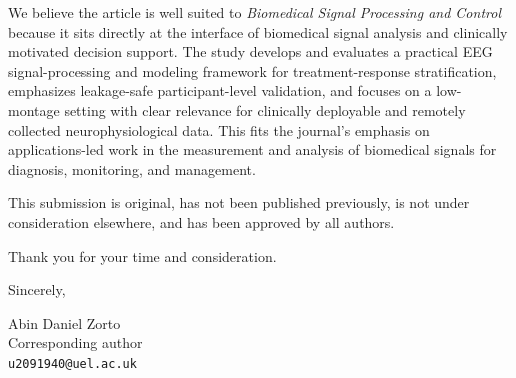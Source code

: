 \documentclass[11pt]{article}
\begin{document}
We believe the article is well suited to \emph{Biomedical Signal Processing and Control} because it sits directly at the interface of biomedical signal analysis and clinically motivated decision support. The study develops and evaluates a practical EEG signal-processing and modeling framework for treatment-response stratification, emphasizes leakage-safe participant-level validation, and focuses on a low-montage setting with clear relevance for clinically deployable and remotely collected neurophysiological data. This fits the journal's emphasis on applications-led work in the measurement and analysis of biomedical signals for diagnosis, monitoring, and management.

This submission is original, has not been published previously, is not under consideration elsewhere, and has been approved by all authors.

Thank you for your time and consideration.

Sincerely,

\vspace{1.2em}

Abin Daniel Zorto\\
Corresponding author\\
\texttt{u2091940@uel.ac.uk}
\end{document}
